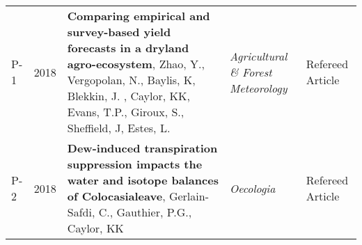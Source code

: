 
\begin{supertabular}{lcp{8.25cm}p{4.75cm}p{1.75cm}}
P-1 & 2018 & {\bf Comparing empirical and survey-based yield forecasts in a dryland agro-ecosystem}, Zhao, Y., Vergopolan, N., Baylis, K, Blekkin, J. , Caylor, KK, Evans, T.P., Giroux, S., Sheffield, J, Estes, L.  & \emph{ Agricultural \& Forest Meteorology } & Refereed Article\\
P-2 & 2018 & {\bf Dew-induced transpiration suppression impacts the water and isotope balances of Colocasialeave}, Gerlain-Safdi, C., Gauthier, P.G., Caylor, KK  & \emph{ Oecologia } & Refereed Article\\
\end{supertabular}


